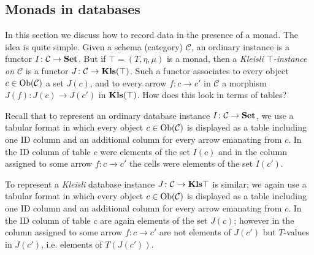 \documentclass{book}
\def\tn{\textnormal}
\def\mc{\mathcal}
\def\Ob{\tn{Ob}}
\def\to{\rightarrow}
\def\taking{\colon}
\def\Kls{{\bf Kls}}
\def\Set{{\bf Set}}
\def\mcC{\mc{C}}
\theoremstyle{remark}
\theoremstyle{definition}
\begin{document}

\subsection{Monads in databases}\label{sec:monads in db}

In this section we discuss how to record data in the presence of a monad. The idea is quite simple. Given a schema (category) $\mcC$, an ordinary instance is a functor $I\taking\mcC\to\Set$. But if $\top=(T,\eta,\mu)$ is a monad, then a {\em Kleisli $\top$-instance on $\mcC$} is a functor $J\taking\mcC\to\Kls(\top)$. Such a functor associates to every object $c\in\Ob(\mcC)$ a set $J(c)$, and to every arrow $f\taking c\to c'$ in $\mcC$ a morphism $J(f)\taking J(c)\to J(c')$ in $\Kls(\top)$. How does this look in terms of tables?

Recall that to represent an ordinary database instance $I\taking\mcC\to\Set$, we use a tabular format in which every object $c\in\Ob(\mcC)$ is displayed as a table including one ID column and an additional column for every arrow emanating from $c$. In the ID column of table $c$ were elements of the set $I(c)$ and in the column assigned to some arrow $f\taking c\to c'$ the cells were elements of the set $I(c')$. 

To represent a {\em Kleisli} database instance $J\taking\mcC\to\Kls{\top}$ is similar; we again use a tabular format in which every object $c\in\Ob(\mcC)$ is displayed as a table including one ID column and an additional column for every arrow emanating from $c$. In the ID column of table $c$ are again elements of the set $J(c)$; however in the column assigned to some arrow $f\taking c\to c'$ are not elements of $J(c')$ but $T$-values in $J(c')$, i.e. elements of $T(J(c'))$. 
\end{document}
